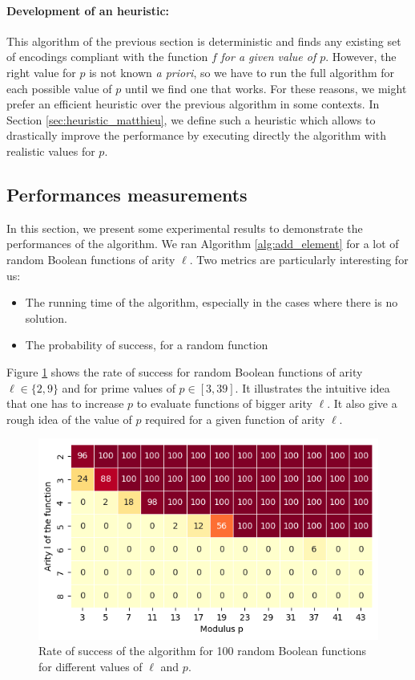 \paragraph{Development of an heuristic:} This algorithm of the previous section is deterministic and finds any existing set of encodings compliant with the function $f$ \emph{for a given value of $p$}. However, the right value for $p$ is not known \emph{a priori}, so we have to run the full algorithm for each possible value of $p$ until we find one that works. For these reasons, we might prefer an efficient heuristic over the previous algorithm in some contexts. In Section \ref{sec:heuristic_matthieu}, we define such a heuristic which allows to drastically improve the performance by executing directly the algorithm with realistic values for $p$. 




\subsection{Performances measurements}

In this section, we present some experimental results to demonstrate the performances of the algorithm. We ran Algorithm \ref{alg:add_element} for a lot of random Boolean functions of arity $\ell$. Two metrics are particularly interesting for us:
\begin{itemize}
    \item The running time of the algorithm, especially in the cases where there is no solution.
    \item The probability of success, for a random function
\end{itemize}


Figure \ref{fig:heatmap_success} shows the rate of success for random Boolean functions of arity $\ell \in \{2, 9\}$ and for prime values of $p \in [3, 39]$. It illustrates the intuitive idea that one has to increase $p$ to evaluate functions of bigger arity $\ell$. It also give a rough idea of the value of $p$ required for a given function of arity $\ell$.

\begin{figure}
    \centering
    \includegraphics[]{images/heatmap_success.png}
    \caption{Rate of success of the algorithm for 100 random Boolean functions for different values of $\ell$ and $p$.}
    \label{fig:heatmap_success}
\end{figure}


